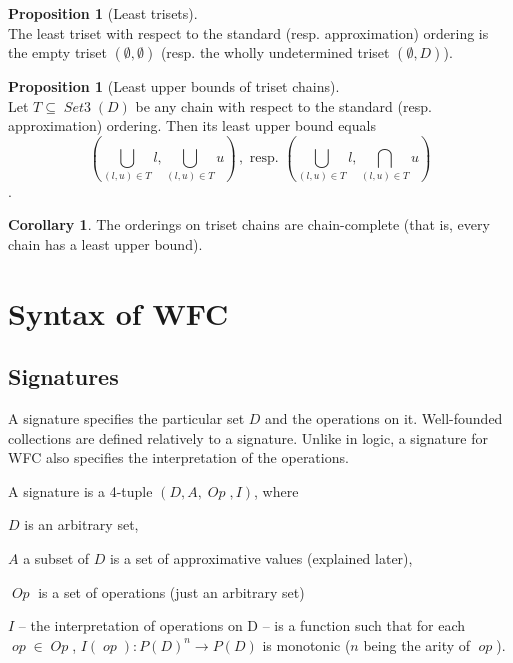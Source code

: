 \documentclass[oneside,12pt]{book}
\theoremstyle{definition}
\newtheorem{corollary}[theorem]{Corollary}
\newtheorem{proposition}[theorem]{Proposition}
\theoremstyle{remark}
\newcommand\var[1]{\mathop{\mathit{#1}}\nolimits}
\newcommand{\pSet}{P}
\newcommand{\op}{\var{op}}
\newcommand{\Op}{\var{Op}}
\newcommand{\SetIII}{\var{Set3}}
\begin{document}
\begin{proposition}[Least trisets] \label{leastTrisets} \hfill \\
  The least triset with respect to the standard (resp. approximation) ordering
  is the empty triset $(\emptyset, \emptyset)$ (resp. the wholly undetermined
  triset $(\emptyset, D)$).
\end{proposition}

\begin{proposition}[Least upper bounds of triset chains]
\label{leastUpperBoundsTrisets} \hfill \\
  Let $T \subseteq \SetIII(D)$ be any chain with respect to the standard
  (resp. approximation) ordering. Then its least upper bound equals
  \[(\bigcup_{(l,u) \in T}l,\bigcup_{(l,u) \in T}u)\,,
  \text{ resp. } (\bigcup_{(l,u) \in T}l,\bigcap_{(l,u) \in T}u)\].
\end{proposition}

\begin{corollary}
  The orderings on triset chains are chain-complete (that is, every chain has
  a least upper bound).
\end{corollary}


\section{Syntax of WFC}
\subsection{Signatures}
A signature specifies the particular set $D$ and the operations on it.
Well-founded collections are defined relatively to a signature. Unlike in
logic, a signature for WFC also specifies the interpretation of the operations.

\begin{defBox}
  A signature is a 4-tuple $(D, A, \Op, I)$, where
  \begin{compactitem}
    \item $D$ is an arbitrary set,
    \item $A$ a subset of $D$ is a set of approximative values (explained later),
    \item $\Op$ is a set of operations (just an arbitrary set)
    \item $I$ -- the interpretation
      of operations on D -- is a function such that for each $\op \in \Op$,
      $I(\op)\colon \pSet(D)^n \to \pSet(D)$ is monotonic ($n$ being the arity
      of $\op$).
  \end{compactitem}
\end{defBox}
\end{document}
